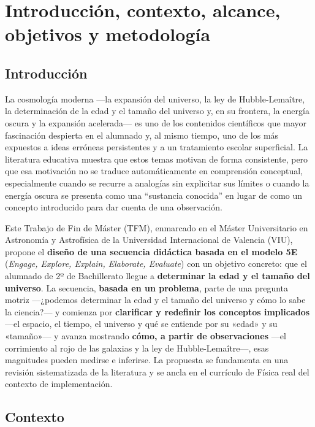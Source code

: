 \chapter{Introducción, contexto, alcance, objetivos y metodología}\label{cap:intro}

\section{Introducción}\label{sec:introduccion}

La cosmología moderna ---la expansión del universo, la ley de Hubble-Lemaître, la determinación de la edad y el tamaño del universo y, en su frontera, la energía oscura y la expansión acelerada--- es uno de los contenidos científicos que mayor fascinación despierta en el alumnado y, al mismo tiempo, uno de los más expuestos a ideas erróneas persistentes y a un tratamiento escolar superficial. La literatura educativa muestra que estos temas motivan de forma consistente, pero que esa motivación no se traduce automáticamente en comprensión conceptual, especialmente cuando se recurre a analogías sin explicitar sus límites o cuando la energía oscura se presenta como una ``sustancia conocida'' en lugar de como un concepto introducido para dar cuenta de una observación.

Este Trabajo de Fin de Máster (TFM), enmarcado en el Máster Universitario en Astronomía y Astrofísica de la Universidad Internacional de Valencia (VIU), propone el \textbf{diseño de una secuencia didáctica basada en el modelo 5E} (\textit{Engage, Explore, Explain, Elaborate, Evaluate}) con un objetivo concreto: que el alumnado de 2º de Bachillerato llegue a \textbf{determinar la edad y el tamaño del universo}. La secuencia, \textbf{basada en un problema}, parte de una pregunta motriz ---¿podemos determinar la edad y el tamaño del universo y cómo lo sabe la ciencia?--- y comienza por \textbf{clarificar y redefinir los conceptos implicados} ---el espacio, el tiempo, el universo y qué se entiende por su «edad» y su «tamaño»--- y avanza mostrando \textbf{cómo, a partir de observaciones} ---el corrimiento al rojo de las galaxias y la ley de Hubble-Lemaître---, esas magnitudes pueden medirse e inferirse. La propuesta se fundamenta en una revisión sistematizada de la literatura y se ancla en el currículo de Física real del contexto de implementación.

\section{Contexto}\label{sec:contexto}

